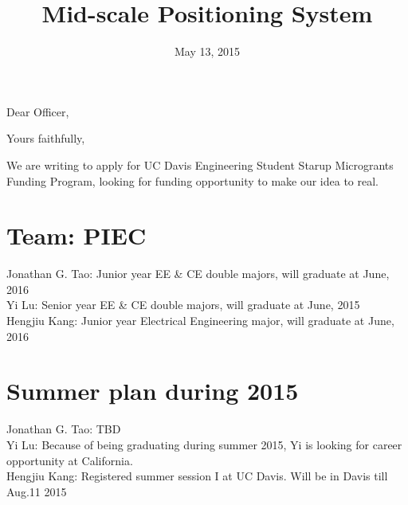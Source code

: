 \documentclass[11pt,a4paper,sans]{moderncv}        %
\title{Mid-scale Positioning System}                               %
\begin{document}
\date{May 13, 2015}
\opening{Dear Officer,}
\closing{Yours faithfully,}
\makelettertitle

We are writing to apply for UC Davis Engineering Student Starup Microgrants Funding Program, looking for funding opportunity to make our idea to real.

\section{Team: PIEC}
Jonathan G. Tao: Junior year EE \& CE double majors, will graduate at June, 2016 \\
Yi Lu: Senior year EE \& CE double majors, will graduate at June, 2015 \\
Hengjiu Kang: Junior year Electrical Engineering major, will graduate at June, 2016

\section{Summer plan during 2015}
Jonathan G. Tao: TBD\\
Yi Lu: Because of being graduating during summer 2015, Yi is looking for career opportunity at California.\\
Hengjiu Kang: Registered summer session I at UC Davis. Will be in Davis till Aug.11 2015
\end{document}

